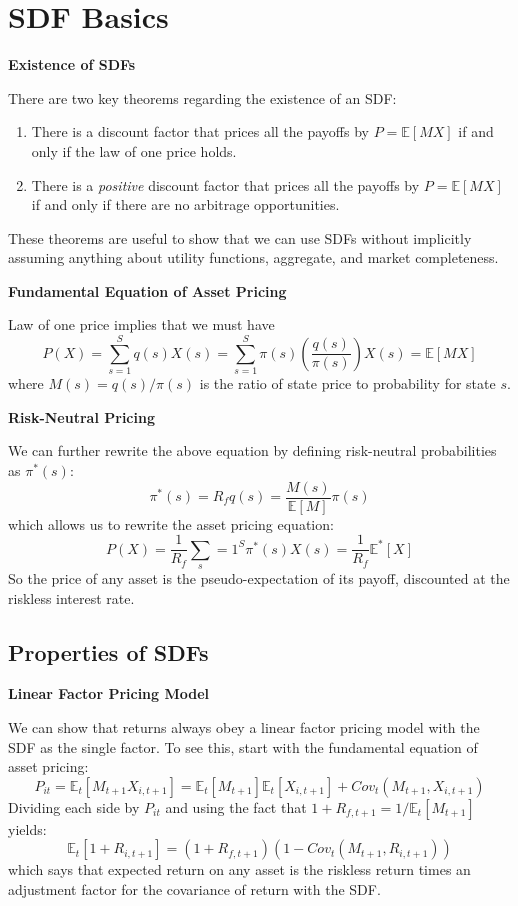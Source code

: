 \documentclass[
]{book}
\providecommand{\tightlist}{%
  \setlength{\itemsep}{0pt}\setlength{\parskip}{0pt}}
\begin{document}
\hypertarget{sdf-basics}{%
\section{SDF Basics}\label{sdf-basics}}

\textbf{Existence of SDFs}

There are two key theorems regarding the existence of an SDF:

\begin{enumerate}
\def\labelenumi{\arabic{enumi}.}
\tightlist
\item
  There is a discount factor that prices all the payoffs by \(P=\mathbb{E}[MX]\) if and only if the law of one price holds.
\item
  There is a \emph{positive} discount factor that prices all the payoffs by \(P = \mathbb{E}[MX]\) if and only if there are no arbitrage opportunities.
\end{enumerate}

These theorems are useful to show that we can use SDFs without implicitly assuming anything about utility functions, aggregate, and market completeness.

\textbf{Fundamental Equation of Asset Pricing}

Law of one price implies that we must have
\[
P(X) = \sum_{s=1}^S q(s)X(s) = \sum_{s=1}^S \pi(s)\left(\frac{q(s)}{\pi(s)}\right)X(s) = \mathbb{E}[MX]
\]
where \(M(s) = q(s) / \pi(s)\) is the ratio of state price to probability for state \(s\).

\textbf{Risk-Neutral Pricing}

We can further rewrite the above equation by defining risk-neutral probabilities as \(\pi^*(s)\):
\[
\pi^*(s) = R_f q(s) =\frac{M(s)}{\mathbb{E}[M]} \pi(s)
\]
which allows us to rewrite the asset pricing equation:
\[
P(X) = \frac{1}{R_f} \sum_s=1^S \pi^*(s) X(s) = \frac{1}{R_f} \mathbb{E}^*[X]
\]
So the price of any asset is the pseudo-expectation of its payoff, discounted at the riskless interest rate.

\hypertarget{properties-of-sdfs}{%
\subsection{Properties of SDFs}\label{properties-of-sdfs}}

\textbf{Linear Factor Pricing Model}

We can show that returns always obey a linear factor pricing model with the SDF as the single factor. To see this, start with the fundamental equation of asset pricing:
\[
P_{it} = \mathbb{E}_t[M_{t+1}X_{i,t+1}] = \mathbb{E}_t[M_{t+1}]\mathbb{E}_t[X_{i,t+1}] + Cov_t(M_{t+1}, X_{i,t+1})
\]
Dividing each side by \(P_{it}\) and using the fact that \(1+R_{f,t+1} = 1 / \mathbb{E}_t[M_{t+1}]\) yields:
\[
\mathbb{E}_t[1+R_{i,t+1}] = (1 + R_{f,t+1})(1 - Cov_t(M_{t+1}, R_{i,t+1}))
\]
which says that expected return on any asset is the riskless return times an adjustment factor for the covariance of return with the SDF.
\end{document}
